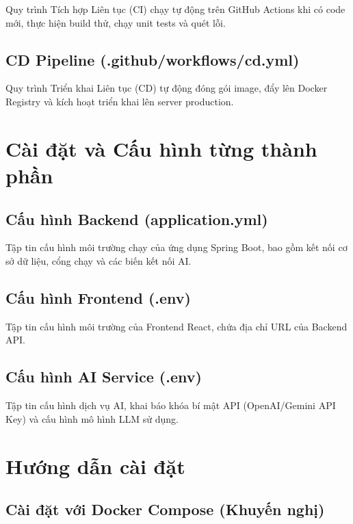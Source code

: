 \documentclass[12pt,a4paper]{report}
\begin{document}
Quy trình Tích hợp Liên tục (CI) chạy tự động trên GitHub Actions khi có code mới, thực hiện build thử, chạy unit tests và quét lỗi.

\subsection{CD Pipeline (.github/workflows/cd.yml)}

Quy trình Triển khai Liên tục (CD) tự động đóng gói image, đẩy lên Docker Registry và kích hoạt triển khai lên server production.

\section{Cài đặt và Cấu hình từng thành phần}

\subsection{Cấu hình Backend (application.yml)}

Tập tin cấu hình môi trường chạy của ứng dụng Spring Boot, bao gồm kết nối cơ sở dữ liệu, cổng chạy và các biến kết nối AI.

\subsection{Cấu hình Frontend (.env)}

Tập tin cấu hình môi trường của Frontend React, chứa địa chỉ URL của Backend API.

\subsection{Cấu hình AI Service (.env)}

Tập tin cấu hình dịch vụ AI, khai báo khóa bí mật API (OpenAI/Gemini API Key) và cấu hình mô hình LLM sử dụng.

\section{Hướng dẫn cài đặt}

\subsection{Cài đặt với Docker Compose (Khuyến nghị)}
\end{document}
